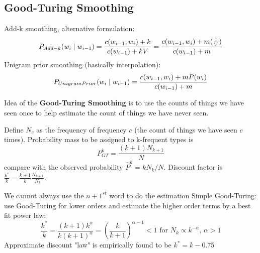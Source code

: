 \documentclass[12pt]{article}
\begin{document}
\subsection{Good-Turing Smoothing}
Add-k smoothing, alternative formulation:
\[ P_{Add-k}(w_i\mid w_{i-1}) = \frac{c(w_{i-1},w_i) + k}{c(w_{i-1}) + kV} = \frac{c(w_{i-1},w_i) + m(\frac{1}{V})}{c(w_{i-1}) + m} \]
Unigram prior smoothing (basically interpolation):
\[ P_{UnigramPrior}(w_i\mid w_{i-1}) = \frac{c(w_{i-1},w_i) + mP(w_i)}{c(w_{i-1}) + m} \]
\par Idea of the \textbf{Good-Turing Smoothing} is to use the counts of things we have seen once to help estimate the count of things we have never seen.
\par Define $N_c$ as the frequency of frequency $c$ (the count of things we have seen $c$ times). Probability mass to be assigned to k-frequent types is
\[ P^k_{GT} = \frac{(k+1)N_{k+1}}{N} \]
compare with the observed probability $\hat{P}^k = kN_k / N$. Discount factor is $\frac{k^*}{k} = \frac{k+1}{k} \frac{N_{k+1}}{N_k}$.
\par We cannot always use the $n+1^{st}$ word to do the estimation 
Simple Good-Turing: use Good-Turing for lower orders and estimate the higher order terms by a best fit power law:
\[ \frac{k^*}{k} = \frac{(k+1)k^{\alpha}}{k(k+1)^{\alpha}} = \left( \frac{k}{k+1} \right)^{\alpha-1} < 1 \text{ for } N_k \propto k^{-\alpha} \text{, } \alpha > 1 \]
Approximate discount "law" is empirically found to be $k^* = k - 0.75$
\end{document}
